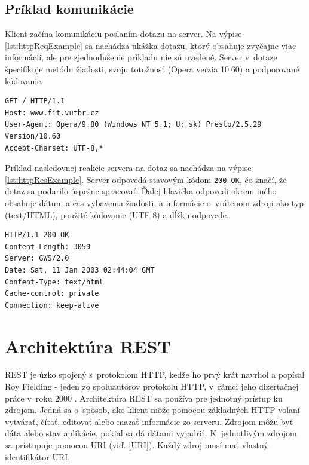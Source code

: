 \documentclass[slovak]{fitthesis}
\begin{document}
\newpage

\subsection{Príklad komunikácie}

Klient začína komunikáciu poslaním dotazu na server. Na výpise \ref{lst:httpReqExample} sa nachádza ukážka dotazu, ktorý obsahuje zvyčajne viac informácií, ale pre zjednodušenie príkladu nie sú uvedené. Server v~dotaze špecifikuje metódu žiadosti, svoju totožnosť (Opera verzia 10.60) a podporované kódovanie.
\begin{lstlisting}[caption=príklad HTTP dotazu,frame=tlrb,label={lst:httpReqExample}]
GET / HTTP/1.1
Host: www.fit.vutbr.cz
User-Agent: Opera/9.80 (Windows NT 5.1; U; sk) Presto/2.5.29 Version/10.60
Accept-Charset: UTF-8,*
\end{lstlisting}
Príklad nasledovnej reakcie servera na dotaz sa nachádza na výpise \ref{lst:httpResExample}. Server odpovedá stavovým kódom \texttt{200 OK}, čo značí, že dotaz sa podarilo úspešne spracovať. Ďalej hlavička odpovedi okrem iného obsahuje dátum a čas vybavenia žiadosti, a informácie o~vrátenom zdroji ako typ (text/HTML), použité kódovanie (UTF-8) a dĺžku odpovede. 
\begin{lstlisting}[caption=príklad HTTP odpovedi,frame=tlrb,label={lst:httpResExample}]
HTTP/1.1 200 OK
Content-Length: 3059
Server: GWS/2.0
Date: Sat, 11 Jan 2003 02:44:04 GMT
Content-Type: text/html
Cache-control: private
Connection: keep-alive
\end{lstlisting}



\section{Architektúra REST}\label{rest}
REST je úzko spojený s~protokolom HTTP, keďže ho prvý krát navrhol a popísal Roy Fielding - jeden zo spoluautorov protokolu HTTP, v~rámci jeho dizertačnej práce v~roku 2000 \cite{dizertackaREST}.
Architektúra REST sa používa pre jednotný prístup ku zdrojom. Jedná sa o~spôsob, ako klient môže pomocou základných HTTP volaní vytvárať, čítať, editovať alebo mazať informácie zo serveru. Zdrojom môžu byť dáta alebo stav aplikácie, pokiaľ sa dá dátami vyjadriť. K~jednotlivým zdrojom sa pristupuje pomocou URI (viď. \ref{URI}). Každý zdroj musí mať vlastný identifikátor URI.
\end{document}
